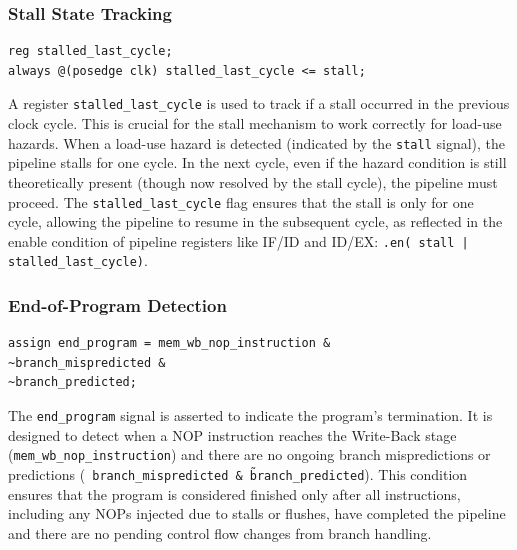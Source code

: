 \documentclass{article}
\numberwithin{figure}{section}
\numberwithin{table}{section}
\begin{document}
    \subsubsection{Stall State Tracking}
\begin{lstlisting}[style=verilog-style]
reg stalled_last_cycle;
always @(posedge clk) stalled_last_cycle <= stall;\end{lstlisting}
    A register \texttt{stalled\_last\_cycle} is used to track if a stall occurred in the previous clock cycle. This is crucial for the stall mechanism to work correctly for load-use hazards. When a load-use hazard is detected (indicated by the \texttt{stall} signal), the pipeline stalls for one cycle. In the next cycle, even if the hazard condition is still theoretically present (though now resolved by the stall cycle), the pipeline must proceed. The \texttt{stalled\_last\_cycle} flag ensures that the stall is only for one cycle, allowing the pipeline to resume in the subsequent cycle, as reflected in the enable condition of pipeline registers like IF/ID and ID/EX: \texttt{.en(~stall | stalled\_last\_cycle)}.


\subsubsection{End-of-Program Detection}
\begin{lstlisting}[style=verilog-style]
assign end_program = mem_wb_nop_instruction &
~branch_mispredicted &
~branch_predicted;\end{lstlisting}
    The \texttt{end\_program} signal is asserted to indicate the program's termination. It is designed to detect when a NOP instruction reaches the Write-Back stage (\texttt{mem\_wb\_nop\_instruction}) and there are no ongoing branch mispredictions or predictions (\texttt{~branch\_mispredicted \& \~branch\_predicted}). This condition ensures that the program is considered finished only after all instructions, including any NOPs injected due to stalls or flushes, have completed the pipeline and there are no pending control flow changes from branch handling.
\end{document}
